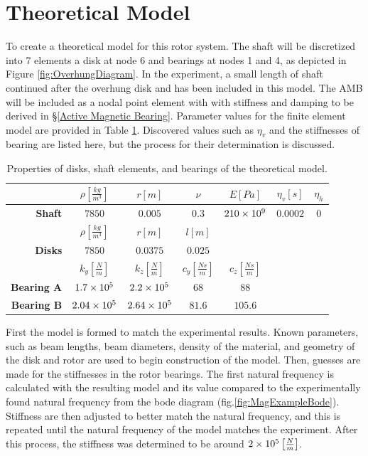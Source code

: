 \section{Theoretical Model}
To create a theoretical model for this rotor system. The shaft will be discretized into 7 elements a disk at node 6 and bearings at nodes 1 and 4, as depicted in Figure \ref{fig:OverhungDiagram}. In the experiment, a small length of shaft continued after the overhung disk and has been included in this model. The AMB will be included as a nodal point element with with stiffness and damping to be derived in \S\ref{Active Magnetic Bearing}. Parameter values for the finite element model are provided in Table \ref{tab:OverhungParameters}. Discovered values such as $ \eta_v $ and the stiffnesses of bearing are listed here, but the process for their determination is discussed.
\begin{table}
	\caption{Properties of disks, shaft elements, and bearings of the theoretical model.} \label{tab:MagTheoryRotorTable}
	\centering
	\label{tab:OverhungParameters}
	\begin{tabular}{rcccccc}
							&$\rho\left[\frac{kg}{m^3}\right]$	&$r[m]$					&$\nu$				&$E[Pa]$			&$ \eta_v[s] $	&$ \eta_h $	\\\hline
		\textbf{Shaft}		&$7850$					&$0.005$				&$0.3$				&$\num{210E9}$		&$ 0.0002 $		&$ 0 $		\\[-.2em]
							&$\rho\left[\frac{kg}{m^3}\right]$	&$r[m]$					&$l[m]$				&					&				&			\\\hline
		\textbf{Disks}		&$7850$					&$0.0375$				&$0.025$			&					&				&			\\[-.2em]
							&$k_y\left[\frac{N}{m}\right]$		&$k_z\left[\frac{N}{m}\right]$		&$c_y\left[\frac{Ns}{m}\right]$&$c_z\left[\frac{Ns}{m}\right]$&				&			\\\hline
		\textbf{Bearing A}	&$1.7\times 10^{5}$				&$2.2\times 10^{5}$				&$68$				&$88$				&				&			\\[-.5em]
		\textbf{Bearing B}	&$2.04\times 10^{5}$			&$2.64\times 10^{5}$			&$81.6$				&$105.6$			&				&			\\
	\end{tabular}
\end{table}
First the model is formed to match the experimental results. Known parameters, such as beam lengths, beam diameters, density of the material, and geometry of the disk and rotor are used to begin construction of the model. Then, guesses are made for the stiffnesses in the rotor bearings. The first natural frequency is calculated with the resulting model and its value compared to the experimentally found natural frequency from the bode diagram (fig.\ref{fig:MagExampleBode}). Stiffness are then adjusted to better match the natural frequency, and this is repeated until the natural frequency of the model matches the experiment. After this process, the stiffness was determined to be around $ 2\times 10^{5} \left[\frac{N}{m}\right]$.\par
